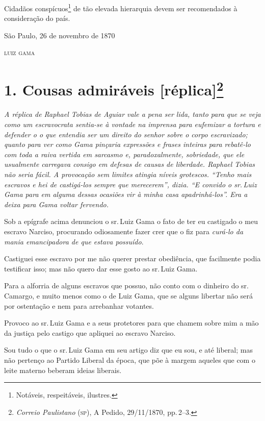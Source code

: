 Cidadãos conspícuos\footnote{ Notáveis, respeitáveis, ilustres.} de
tão elevada hierarquia devem ser recomendados à consideração do país.

\begin{flushright}
São Paulo, 26 de novembro de 1870

\textsc{luiz gama}
\end{flushright}

\chapter{1. Cousas admiráveis {[}réplica{]}\footnote{\emph{Correio Paulistano} (\textsc{sp}), A Pedido, 29/11/1870,
  pp.\,2--3.}} %

\begin{didascalia}
\emph{A réplica de Raphael Tobias de Aguiar vale a pena ser lida, tanto
para que se veja como um escravocrata sentia-se à vontade na imprensa
para eufemizar a tortura e defender o o que entendia ser um direito do
senhor sobre o corpo escravizado; quanto para ver como Gama pinçaria
expressões e frases inteiras para rebatê-lo com toda a raiva vertida em
sarcasmo e, paradoxalmente, sobriedade, que ele usualmente carregava
consigo em defesas de causas de liberdade. Raphael Tobias não seria
fácil. A provocação sem limites atingia níveis grotescos. ``Tenho mais
escravos e hei de castigá-los sempre que merecerem'', dizia. ``E convido o
sr.\,Luiz Gama para em alguma dessas ocasiões vir à minha casa
apadrinhá-los''. Era a deixa para Gama voltar fervendo.}
\end{didascalia}


Sob a epígrafe acima denunciou o sr.\,Luiz Gama o fato de ter eu
castigado o meu escravo Narciso, procurando odiosamente fazer crer que o
fiz para \emph{curá-lo da mania emancipadora de que estava possuído}.

Castiguei esse escravo por me não querer prestar obediência, que
facilmente podia testificar isso; mas não quero dar esse gosto ao sr.\,Luiz Gama.

Para a alforria de alguns escravos que possuo, não conto com o dinheiro
do sr.\,Camargo, e muito menos como o de Luiz Gama, que se alguns
libertar não será por ostentação e nem para arrebanhar votantes.

Provoco ao sr.\,Luiz Gama e a seus protetores para que chamem sobre mim a
mão da justiça pelo castigo que apliquei ao escravo Narciso.

Sou tudo o que o sr.\,Luiz Gama em seu artigo diz que eu sou, e até
liberal; mas não pertenço ao Partido Liberal da época, que põe à margem
aqueles que com o leite materno beberam ideias liberais.

